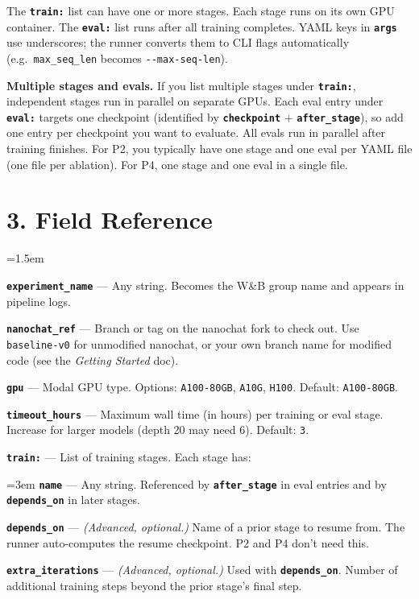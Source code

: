 \documentclass[9pt]{extarticle}
\newcommand{\cmd}[1]{\colorbox{gray!10}{\texttt{#1}}}
\newcommand{\field}[1]{\texttt{\textbf{#1}}}
\begin{document}
The \field{train:} list can have one or more stages. Each stage runs on its own GPU container. The \field{eval:} list runs after all training completes. YAML keys in \field{args} use underscores; the runner converts them to CLI flags automatically (e.g.\ \cmd{max\_seq\_len} becomes \cmd{-{}-max-seq-len}).

\textbf{Multiple stages and evals.} If you list multiple stages under \field{train:}, independent stages run in parallel on separate GPUs. Each eval entry under \field{eval:} targets one checkpoint (identified by \field{checkpoint} + \field{after\_stage}), so add one entry per checkpoint you want to evaluate. All evals run in parallel after training finishes. For P2, you typically have one stage and one eval per YAML file (one file per ablation). For P4, one stage and one eval in a single file.

\leftskip=0pt
\section*{3. Field Reference}
\leftskip=1.5em

\field{experiment\_name} --- Any string. Becomes the W\&B group name and appears in pipeline logs.

\field{nanochat\_ref} --- Branch or tag on the nanochat fork to check out. Use \cmd{baseline-v0} for unmodified nanochat, or your own branch name for modified code (see the \textit{Getting Started} doc).

\field{gpu} --- Modal GPU type. Options: \cmd{A100-80GB}, \cmd{A10G}, \cmd{H100}. Default: \cmd{A100-80GB}.

\field{timeout\_hours} --- Maximum wall time (in hours) per training or eval stage. Increase for larger models (depth 20 may need 6). Default: \cmd{3}.

\vspace{4pt}
\field{train:} --- List of training stages. Each stage has:

\leftskip=3em
\field{name} --- Any string. Referenced by \field{after\_stage} in eval entries and by \field{depends\_on} in later stages.

\field{depends\_on} --- \textit{(Advanced, optional.)} Name of a prior stage to resume from. The runner auto-computes the resume checkpoint. P2 and P4 don't need this.

\field{extra\_iterations} --- \textit{(Advanced, optional.)} Used with \field{depends\_on}. Number of additional training steps beyond the prior stage's final step.
\end{document}
